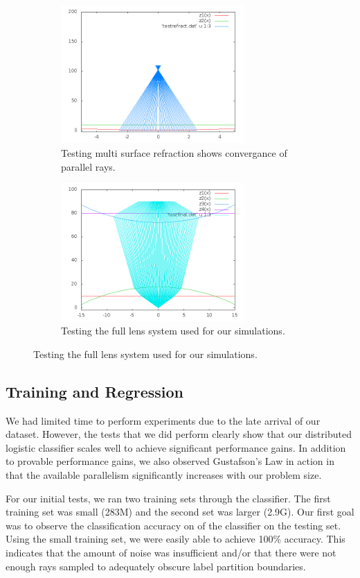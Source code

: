 \begin{figure}
\centering
\begin{subfigure}{.5\textwidth}
  \centering
  \includegraphics[width=7cm]{out4.png}
  \caption{Testing multi surface refraction shows convergance of parallel rays.}
  \label{fig:sub3}
\end{subfigure}%
\begin{subfigure}{.5\textwidth}
  \centering
  \includegraphics[width=7cm]{out5.png}
  \caption{Testing the full lens system used for our simulations.}
  \label{fig:sub4}
\end{subfigure}
\label{fig:secondtrace}
\end{figure}


\subsection{Training and Regression}

We had limited time to perform experiments due to the late arrival of our dataset.  However, the tests that we did perform clearly show that our distributed logistic classifier scales well to achieve significant performance gains.  In addition to provable performance gains, we also observed Gustafson's Law in action in that the available parallelism significantly increases with our problem size.

For our initial tests, we ran two training sets through the classifier.  The first training set was small (283M) and the second set was larger (2.9G).  Our first goal was to observe the classification accuracy on of the classifier on the testing set.  Using the small training set, we were easily able to achieve 100\% accuracy.  This indicates that the amount of noise was insufficient and/or that there were not enough rays sampled to adequately obscure label partition boundaries.

